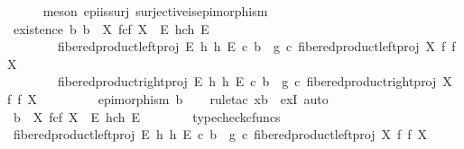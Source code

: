 \begin{isabellebody}
\ \ \ \ \isamarkupfalse%
\ {\isacharparenleft}{\kern0pt}meson\ epi{\isacharunderscore}{\kern0pt}is{\isacharunderscore}{\kern0pt}surj\ surjective{\isacharunderscore}{\kern0pt}is{\isacharunderscore}{\kern0pt}epimorphism{\isacharparenright}{\kern0pt}\isanewline
\isanewline
\ \ \isamarkupfalse%
\ existence{\isacharcolon}{\kern0pt}\ {\isachardoublequoteopen}{\isasymexists}b{\isachardot}{\kern0pt}\ b\ {\isacharcolon}{\kern0pt}\ X\ \isactrlbsub f\isactrlesub {\isasymtimes}\isactrlsub c\isactrlbsub f\isactrlesub \ X\ {\isasymrightarrow}\ E\ \isactrlbsub h\isactrlesub {\isasymtimes}\isactrlsub c\isactrlbsub h\isactrlesub \ E\ {\isasymand}\isanewline
\ \ \ \ \ \ \ \ fibered{\isacharunderscore}{\kern0pt}product{\isacharunderscore}{\kern0pt}left{\isacharunderscore}{\kern0pt}proj\ E\ h\ h\ E\ {\isasymcirc}\isactrlsub c\ b\ {\isacharequal}{\kern0pt}\ g\ {\isasymcirc}\isactrlsub c\ fibered{\isacharunderscore}{\kern0pt}product{\isacharunderscore}{\kern0pt}left{\isacharunderscore}{\kern0pt}proj\ X\ f\ f\ X\ {\isasymand}\isanewline
\ \ \ \ \ \ \ \ fibered{\isacharunderscore}{\kern0pt}product{\isacharunderscore}{\kern0pt}right{\isacharunderscore}{\kern0pt}proj\ E\ h\ h\ E\ {\isasymcirc}\isactrlsub c\ b\ {\isacharequal}{\kern0pt}\ g\ {\isasymcirc}\isactrlsub c\ fibered{\isacharunderscore}{\kern0pt}product{\isacharunderscore}{\kern0pt}right{\isacharunderscore}{\kern0pt}proj\ X\ f\ f\ X\ {\isasymand}\isanewline
\ \ \ \ \ \ \ \ epimorphism\ b{\isachardoublequoteclose}\isanewline
\ \ \isamarkupfalse%
\ {\isacharparenleft}{\kern0pt}rule{\isacharunderscore}{\kern0pt}tac\ x{\isacharequal}{\kern0pt}b\ \ exI{\isacharcomma}{\kern0pt}\ auto{\isacharparenright}{\kern0pt}\isanewline
\ \ \ \ \isamarkupfalse%
\ {\isachardoublequoteopen}b\ {\isacharcolon}{\kern0pt}\ X\ \isactrlbsub f\isactrlesub {\isasymtimes}\isactrlsub c\isactrlbsub f\isactrlesub \ X\ {\isasymrightarrow}\ E\ \isactrlbsub h\isactrlesub {\isasymtimes}\isactrlsub c\isactrlbsub h\isactrlesub \ E{\isachardoublequoteclose}\isanewline
\ \ \ \ \ \ \isamarkupfalse%
\ typecheck{\isacharunderscore}{\kern0pt}cfuncs\isanewline
\ \ \ \ \isamarkupfalse%
\ {\isachardoublequoteopen}fibered{\isacharunderscore}{\kern0pt}product{\isacharunderscore}{\kern0pt}left{\isacharunderscore}{\kern0pt}proj\ E\ h\ h\ E\ {\isasymcirc}\isactrlsub c\ b\ {\isacharequal}{\kern0pt}\ g\ {\isasymcirc}\isactrlsub c\ fibered{\isacharunderscore}{\kern0pt}product{\isacharunderscore}{\kern0pt}left{\isacharunderscore}{\kern0pt}proj\ X\ f\ f\ X{\isachardoublequoteclose}\isanewline

\end{isabellebody}

